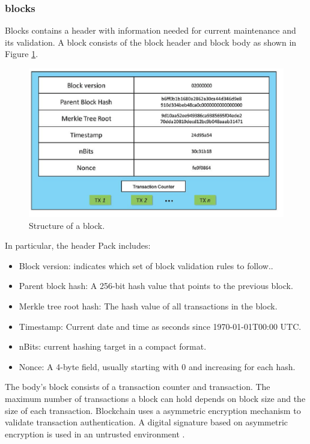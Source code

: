 \subsubsection{blocks}\label{sec:blocks}
Blocks contains a header with information needed for current maintenance and its validation. A block consists of the block header and block body as shown in Figure \ref{fig:block}. 

\begin{figure}[htbp]
\begin{center}
  \includegraphics[scale=0.5]{images/blockStructure.png}
\caption{Structure of a block. \cite{zheng2016blockchain}}
\label{fig:block}
\end{center}
\end{figure}

In particular, the header Pack includes:

\begin{itemize}
\item Block version: indicates which set of block validation rules to follow..
\item Parent block hash: A 256-bit hash value that points to the previous block.
\item Merkle tree root hash: The hash value of all transactions in the block.
\item Timestamp: Current date and time as seconds since 1970-01-01T00:00 UTC.
\item  nBits: current hashing target in a compact format.
\item Nonce: A 4-byte field, usually starting with 0 and increasing for each hash.
\end{itemize}

The body's block consists of a transaction counter and transaction. The maximum number of transactions a block can hold depends on block size and the size of each transaction. Blockchain uses a asymmetric encryption mechanism to validate transaction authentication. A digital signature based on asymmetric encryption is used in an untrusted environment \cite{zheng2016blockchain}.

